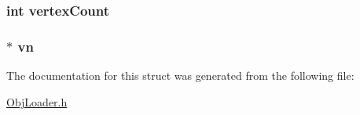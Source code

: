 \hypertarget{struct_mesh_obj_a02ef9e95c4651c7efdb3a39e29078571}{
\subsubsection[{vertex\-Count}]{\setlength{\rightskip}{0pt plus 5cm}int vertex\-Count}}\label{struct_mesh_obj_a02ef9e95c4651c7efdb3a39e29078571}
\hypertarget{struct_mesh_obj_ac5d7157a9bfcd4f0e17577703b3e1519}{
\subsubsection[{vn}]{$\ast$ vn}}\label{struct_mesh_obj_ac5d7157a9bfcd4f0e17577703b3e1519}


The documentation for this struct was generated from the following file\-:\begin{DoxyCompactItemize}
\item 
\hyperlink{_obj_loader_8h}{Obj\-Loader.\-h}\end{DoxyCompactItemize}

